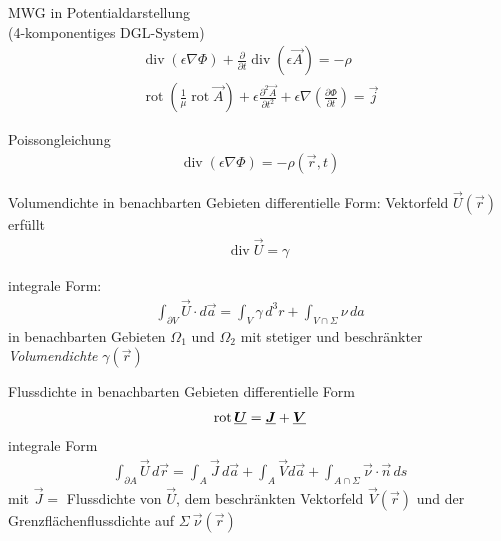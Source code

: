 \documentclass[a6paper]{kartei}
\renewcommand{\div}{\mathrm{div}\;}
\begin{document}
\begin{karte}{MWG in Potentialdarstellung \\(4-komponentiges DGL-System)}
 \begin{eqnarray*}
  \operatorname{div}(\epsilon \nabla \Phi) + \frac{\partial}{\partial t} \operatorname{div}(\epsilon \vec{A}) = - \rho \\
  \operatorname{rot}\left(\frac{1}{\mu} \operatorname{rot} \vec{A} \right) + \epsilon \frac{\partial^{2}\vec{A}}{\partial t^{2}} + \epsilon \nabla \left( \frac{\partial \Phi}{\partial t} \right) = \vec{j} 
 \end{eqnarray*}
\end{karte}





\begin{karte}{Poissongleichung}
\begin{eqnarray*}
 \operatorname{div}(\epsilon \nabla \Phi) = - \rho(\vec{r},t)
\end{eqnarray*}
\end{karte}


\begin{karte}{Volumendichte in benachbarten Gebieten }differentielle Form:
Vektorfeld $\vec{U}(\vec{r})$ erfüllt 
\begin{eqnarray*}
  \div \vec{U} = \gamma
 \end{eqnarray*}

integrale Form:
 \begin{eqnarray*}
  \int_{\partial V} \vec{U} \cdot d\vec{a} = \int_{V} \gamma \, d^{3}r + \int_{V \cap \Sigma} \nu \, da
 \end{eqnarray*} in benachbarten Gebieten $\Omega_{1}$ und $\Omega_{2}$ mit stetiger und beschränkter \\\emph{Volumendichte} $\gamma(\vec{r})$
\end{karte}



\begin{karte}{Flussdichte in benachbarten Gebieten }
 differentielle Form\begin{eqnarray*}
  \operatorname{rot} \underline{\boldsymbol {U}} = \underline{\boldsymbol {J}} + \underline{\boldsymbol {V}}
 \end{eqnarray*}
integrale Form
 \begin{eqnarray*}
  \int_{\partial A} \vec{U} \, d\vec{r} = \int_{A} \vec{J} \, d\vec{a} + \int_{A} \vec{V} d\vec{a} + \int_{A \cap \Sigma} \vec{\nu} \cdot \vec{n} \, ds
 \end{eqnarray*}
 mit $\vec{J} = $ Flussdichte von $\vec{U}$, dem beschränkten Vektorfeld $\vec{V}(\vec{r})$ und der Grenzflächenflussdichte auf $\Sigma \ \vec{\nu}(\vec{r})$
\end{karte}
\end{document}
